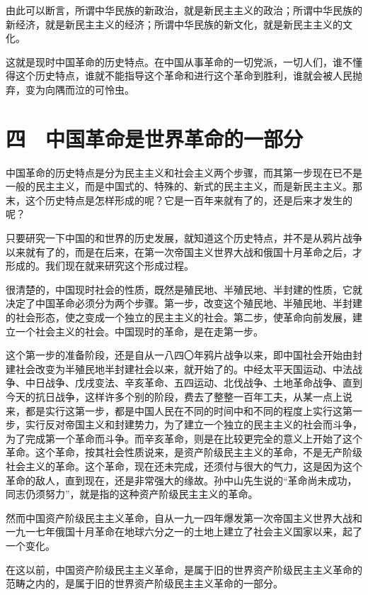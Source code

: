 由此可以断言，所谓中华民族的新政治，就是新民主主义的政治；所谓中华民族的新经济，就是新民主主义的经济；所谓中华民族的新文化，就是新民主主义的文化。

这就是现时中国革命的历史特点。在中国从事革命的一切党派，一切人们，谁不懂得这个历史特点，谁就不能指导这个革命和进行这个革命到胜利，谁就会被人民抛弃，变为向隅而泣的可怜虫。

\section{四　中国革命是世界革命的一部分}

中国革命的历史特点是分为民主主义和社会主义两个步骤，而其第一步现在已不是一般的民主主义，而是中国式的、特殊的、新式的民主主义，而是新民主主义。那末，这个历史特点是怎样形成的呢？它是一百年来就有了的，还是后来才发生的呢？

只要研究一下中国的和世界的历史发展，就知道这个历史特点，并不是从鸦片战争以来就有了的，而是在后来，在第一次帝国主义世界大战和俄国十月革命之后，才形成的。我们现在就来研究这个形成过程。

很清楚的，中国现时社会的性质，既然是殖民地、半殖民地、半封建的性质，它就决定了中国革命必须分为两个步骤。第一步，改变这个殖民地、半殖民地、半封建的社会形态，使之变成一个独立的民主主义的社会。第二步，使革命向前发展，建立一个社会主义的社会。中国现时的革命，是在走第一步。

这个第一步的准备阶段，还是自从一八四〇年鸦片战争以来，即中国社会开始由封建社会改变为半殖民地半封建社会以来，就开始了的。中经太平天国运动、中法战争、中日战争、戊戌变法、辛亥革命、五四运动、北伐战争、土地革命战争、直到今天的抗日战争，这样许多个别的阶段，费去了整整一百年工夫，从某一点上说来，都是实行这第一步，都是中国人民在不同的时间中和不同的程度上实行这第一步，实行反对帝国主义和封建势力，为了建立一个独立的民主主义的社会而斗争，为了完成第一个革命而斗争。而辛亥革命，则是在比较更完全的意义上开始了这个革命。这个革命，按其社会性质说来，是资产阶级民主主义的革命，不是无产阶级社会主义的革命。这个革命，现在还未完成，还须付与很大的气力，这是因为这个革命的敌人，直到现在，还是非常强大的缘故。孙中山先生说的“革命尚未成功，同志仍须努力”，就是指的这种资产阶级民主主义的革命。

然而中国资产阶级民主主义革命，自从一九一四年爆发第一次帝国主义世界大战和一九一七年俄国十月革命在地球六分之一的土地上建立了社会主义国家以来，起了一个变化。

在这以前，中国资产阶级民主主义革命，是属于旧的世界资产阶级民主主义革命的范畴之内的，是属于旧的世界资产阶级民主主义革命的一部分。


